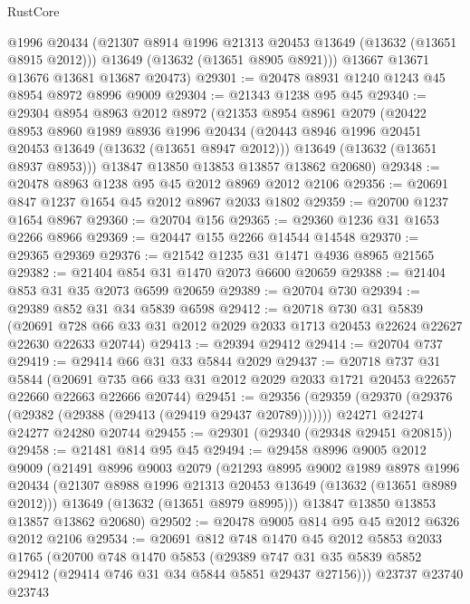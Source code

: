 \begin{lexlean}{RustCore}
\begin{coremodule}
        @1996
        @20434
        (@21307 @8914 @1996 @21313 @20453 @13649 (@13632 (@13651 @8915 @2012)))
        @13649
        (@13632 (@13651 @8905 @8921)))
      @13667
      @13671
      @13676
      @13681
      @13687
      @20473)
@29301 := @20478 @8931 @1240 @1243 @45 @8954 @8972 @8996 @9009
@29304 := @21343 @1238 @95 @45
@29340 := @29304
    @8954
    @8963
    @2012
    @8972
    (@21353
      @8954
      @8961
      @2079
      (@20422
        @8953
        @8960
        @1989
        @8936
        @1996
        @20434
        (@20443 @8946 @1996 @20451 @20453 @13649 (@13632 (@13651 @8947 @2012)))
        @13649
        (@13632 (@13651 @8937 @8953)))
      @13847
      @13850
      @13853
      @13857
      @13862
      @20680)
@29348 := @20478 @8963 @1238 @95 @45 @2012 @8969 @2012 @2106
@29356 := @20691 @847 @1237 @1654 @45 @2012 @8967 @2033 @1802
@29359 := @20700 @1237 @1654 @8967
@29360 := @20704 @156
@29365 := @29360 @1236 @31 @1653 @2266 @8966
@29369 := @20447 @155 @2266 @14544 @14548
@29370 := @29365 @29369
@29376 := @21542 @1235 @31 @1471 @4936 @8965 @21565
@29382 := @21404 @854 @31 @1470 @2073 @6600 @20659
@29388 := @21404 @853 @31 @35 @2073 @6599 @20659
@29389 := @20704 @730
@29394 := @29389 @852 @31 @34 @5839 @6598
@29412 := @20718
    @730
    @31
    @5839
    (@20691 @728 @66 @33 @31 @2012 @2029 @2033 @1713 @20453 @22624 @22627 @22630 @22633 @20744)
@29413 := @29394 @29412
@29414 := @20704 @737
@29419 := @29414 @66 @31 @33 @5844 @2029
@29437 := @20718
    @737
    @31
    @5844
    (@20691 @735 @66 @33 @31 @2012 @2029 @2033 @1721 @20453 @22657 @22660 @22663 @22666 @20744)
@29451 := @29356
    (@29359 (@29370 (@29376 (@29382 (@29388 (@29413 (@29419 @29437 @20789)))))))
    @24271
    @24274
    @24277
    @24280
    @20744
@29455 := @29301 (@29340 (@29348 @29451 @20815))
@29458 := @21481 @814 @95 @45
@29494 := @29458
    @8996
    @9005
    @2012
    @9009
    (@21491
      @8996
      @9003
      @2079
      (@21293
        @8995
        @9002
        @1989
        @8978
        @1996
        @20434
        (@21307 @8988 @1996 @21313 @20453 @13649 (@13632 (@13651 @8989 @2012)))
        @13649
        (@13632 (@13651 @8979 @8995)))
      @13847
      @13850
      @13853
      @13857
      @13862
      @20680)
@29502 := @20478 @9005 @814 @95 @45 @2012 @6326 @2012 @2106
@29534 := @20691
    @812
    @748
    @1470
    @45
    @2012
    @5853
    @2033
    @1765
    (@20700
      @748
      @1470
      @5853
      (@29389 @747 @31 @35 @5839 @5852 @29412 (@29414 @746 @31 @34 @5844 @5851 @29437 @27156)))
    @23737
    @23740
    @23743

\end{coremodule}
\end{lexlean}
